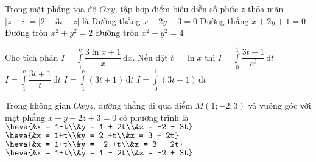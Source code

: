 \begin{ex}%
	Trong mặt phẳng tọa độ $Oxy$, tập hợp điểm biểu diễn số phức $z$ thỏa mãn \break $|z - i| = |2 - 3i - z|$ là
	\choice
	{\True Đường thẳng $x - 2y - 3 = 0$}
	{Đường thẳng $x + 2y + 1 = 0$}
	{Đường tròn $x^2  + y^2 = 2$}
	{Đường tròn $x^2 + y^2 = 4$}
\end{ex}
\begin{ex}%
	Cho tích phân $I = \displaystyle\int\limits_{1}^{\mathrm{e}} \dfrac{3\ln x + 1}{x} \mathrm{\,d}x$. Nếu đặt $t = \ln x$ thì	
	\choice
	{$I = \displaystyle\int\limits_{0}^{1} \dfrac{3t + 1}{e^t} \mathrm{\,d}t$}
	{$I = \displaystyle\int\limits_{1}^{\mathrm{e}} \dfrac{3t + 1}{t} \mathrm{\,d}t$}
	{$I = \displaystyle\int\limits_{1}^{\mathrm{e}} (3t + 1) \mathrm{\,d}t$}
	{\True $I = \displaystyle\int\limits_{0}^{1} (3t + 1) \mathrm{\,d}t$}
\end{ex}

\begin{ex}%
	Trong không gian $Oxyz$, đường thẳng đi qua điểm $M(1;-2;3)$ và vuông góc với mặt phẳng $x + y - 2z + 3 = 0$ có phương trình là	
	\choice
	{$\heva{&x = 1-t\\&y = 1 + 2t\\&z = -2 - 3t}$}
	{$\heva{&x = 1+t\\&y = 2 +t\\&z = 3 - 2t}$}
	{\True $\heva{&x = 1+t\\&y = -2 +t\\&z = 3 - 2t}$}
	{$\heva{&x = 1+t\\&y = 1 - 2t\\&z = -2 + 3t}$}
\end{ex}

